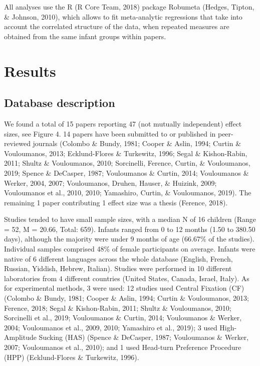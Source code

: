 \documentclass[man]{apa6}
\begin{document}
All analyses use the R (R Core Team, 2018) package Robumeta (Hedges,
Tipton, \& Johnson, 2010), which allows to fit meta-analytic regressions
that take into account the correlated structure of the data, when
repeated measures are obtained from the same infant groups within
papers.

\section{Results}\label{results}

\subsection{Database description}\label{database-description}

We found a total of 15 papers reporting 47 (not mutually independent)
effect sizes, see Figure 4. 14 papers have been submitted to or
published in peer-reviewed journals (Colombo \& Bundy, 1981; Cooper \&
Aslin, 1994; Curtin \& Vouloumanos, 2013; Ecklund-Flores \& Turkewitz,
1996; Segal \& Kishon-Rabin, 2011; Shultz \& Vouloumanos, 2010;
Sorcinelli, Ference, Curtin, \& Vouloumanos, 2019; Spence \& DeCasper,
1987; Vouloumanos \& Curtin, 2014; Vouloumanos \& Werker, 2004, 2007;
Vouloumanos, Druhen, Hauser, \& Huizink, 2009; Vouloumanos et al., 2010,
2010; Yamashiro, Curtin, \& Vouloumanos, 2019). The remaining 1 paper
contributing 1 effect size was a thesis (Ference, 2018).

Studies tended to have small sample sizes, with a median N of 16
children (Range = 52, M = 20.66, Total: 659). Infants ranged from 0 to
12 months (1.50 to 380.50 days), although the majority were under 9
months of age (66.67\% of the studies). Individual samples comprised
48\% of female participants on average. Infants were native of 6
different languages across the whole database (English, French, Russian,
Yiddish, Hebrew, Italian). Studies were performed in 10 different
laboratories from 4 different countries (United States, Canada, Israel,
Italy). As for experimental methods, 3 were used: 12 studies used
Central Fixation (CF) (Colombo \& Bundy, 1981; Cooper \& Aslin, 1994;
Curtin \& Vouloumanos, 2013; Ference, 2018; Segal \& Kishon-Rabin, 2011;
Shultz \& Vouloumanos, 2010; Sorcinelli et al., 2019; Vouloumanos \&
Curtin, 2014; Vouloumanos \& Werker, 2004; Vouloumanos et al., 2009,
2010; Yamashiro et al., 2019); 3 used High-Amplitude Sucking (HAS)
(Spence \& DeCasper, 1987; Vouloumanos \& Werker, 2007; Vouloumanos et
al., 2010); and 1 used Head-turn Preference Procedure (HPP)
(Ecklund-Flores \& Turkewitz, 1996).
\end{document}
